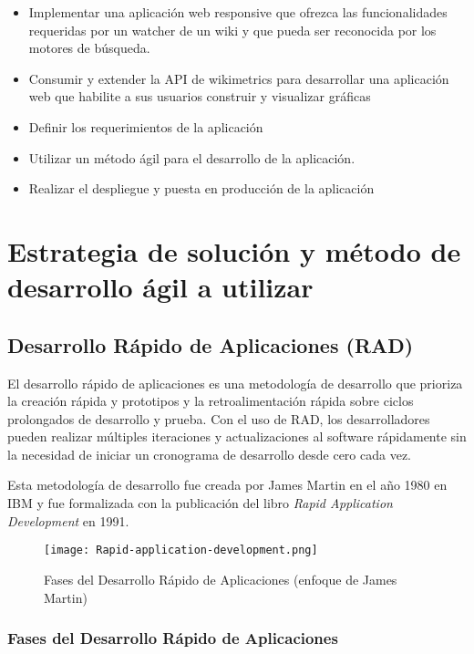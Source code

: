\begin{itemize}
    \item Implementar una aplicación web responsive que ofrezca las funcionalidades requeridas por un watcher de un wiki y que pueda ser reconocida por los motores de búsqueda.
    \item Consumir y extender la API de wikimetrics para desarrollar una aplicación web que habilite a sus usuarios construir y visualizar gráficas
    \item Definir los requerimientos de la aplicación
    \item Utilizar un método ágil para el desarrollo de la aplicación.
    \item Realizar el despliegue y puesta en producción de la aplicación
\end{itemize}

\section{Estrategia de solución y método de desarrollo ágil a utilizar}

\subsection{Desarrollo Rápido de Aplicaciones (RAD)}


El desarrollo rápido de aplicaciones es una metodología de desarrollo que prioriza la creación rápida y prototipos y la retroalimentación rápida sobre ciclos prolongados de desarrollo y prueba. Con el uso de RAD, los desarrolladores pueden realizar múltiples iteraciones y actualizaciones al software rápidamente sin la necesidad de iniciar un cronograma de desarrollo desde cero cada vez.

Esta metodología de desarrollo fue creada por James Martin en el año 1980 en IBM y fue formalizada con la publicación del libro \emph{Rapid Application Development} en 1991.

\begin{figure}[H]
    \texttt{[image: Rapid-application-development.png]}
    \caption{Fases del Desarrollo Rápido de Aplicaciones (enfoque de James Martin)}
    \label{fig:Rapid-application-development}
\end{figure}

\subsubsection{Fases del Desarrollo Rápido de Aplicaciones}

